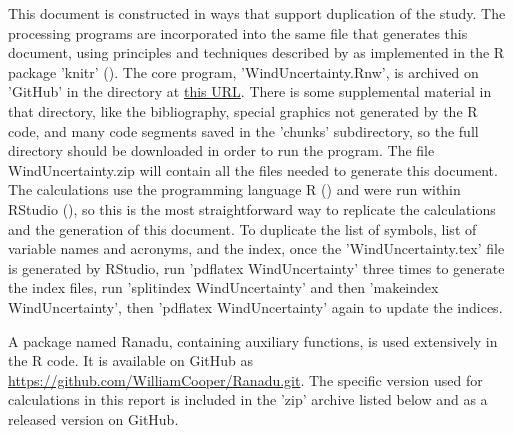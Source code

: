 \documentclass[12pt,twoside,english]{article}\usepackage[]{graphicx}\usepackage[]{color}
\let\OrgIndex\index
\renewcommand*{\index}[1]{\OrgIndex{#1}}
\begin{document}
This document is constructed in ways that support duplication of the
study. The processing programs are incorporated into the same file
that generates this document, using principles and techniques described
by \citet{Xie2014a} as implemented in the R package 'knitr' (\citet{Xie2014b}).
The core program, 'WindUncertainty.Rnw', is archived on 'GitHub' 
in
the directory at \href{https://github.com/WilliamCooper/WindUncertainty.git}{this URL}.
There is some supplemental material in that directory, like the bibliography, special graphics not generated by the R code,
and many code segments saved in the 'chunks' subdirectory, so the
full directory should be downloaded in order to run the program. The file WindUncertainty.zip will contain all the files needed to generate this document. The calculations
use the programming language R (\citet{Rlanguage}) and were run within RStudio
(\citet{RStudio2012}), so this is the most straightforward way to replicate the
calculations and the generation of this document. To duplicate the list of symbols, list of variable names and acronyms, and the index, once the 'WindUncertainty.tex' file is generated by RStudio, run 'pdflatex WindUncertainty' three times to generate the index files, run 'splitindex WindUncertainty' and then 'makeindex WindUncertainty', then 'pdflatex WindUncertainty' again to update the indices.

A package named Ranadu, containing auxiliary functions, is used extensively
in the R code. It is
available on GitHub as \href{https://github.com/WilliamCooper/Ranadu.git}{https://github.com/WilliamCooper/Ranadu.git}. The specific version used for calculations in this
report is included in the 'zip' archive listed below and as a released version on GitHub.
\end{document}
